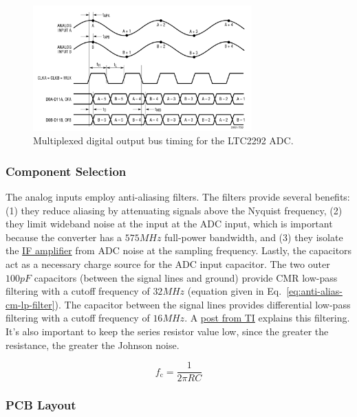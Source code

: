 \begin{figure}[h]
        \centering\includegraphics[width=0.75\textwidth]{data/LTC2292-multiplex.png}
        \caption{Multiplexed digital output bus timing for the LTC2292 ADC.}
        \label{fig:ltc2292-multiplex}
\end{figure}

\subsubsection{Component Selection}
\label{sec:ltc2292-component-selection}

The analog inputs employ anti-aliasing filters. The filters provide several benefits: (1) they
reduce aliasing by attenuating signals above the Nyquist frequency, (2) they limit wideband noise at
the input at the ADC input, which is important because the converter has a $575 \si{MHz}$ full-power
bandwidth, and (3) they isolate the \hyperref[sec:ada4940-2]{IF amplifier} from ADC noise at the
sampling frequency. Lastly, the capacitors act as a necessary charge source for the ADC input
capacitor. The two outer $100 \si{pF}$ capacitors (between the signal lines and ground) provide CMR
low-pass filtering with a cutoff frequency of $32 \si{MHz}$ (equation given in
Eq.~\ref{eq:anti-alias-cm-lp-filter}). The capacitor between the signal lines provides differential
low-pass filtering with a cutoff frequency of $16 \si{MHz}$. A
\href{https://e2e.ti.com/blogs_/archives/b/precisionhub/archive/2015/11/06/three-guidelines-for-designing-anti-aliasing-filters}{post
  from TI} explains this filtering. It's also important to keep the series resistor value low, since
the greater the resistance, the greater the Johnson noise.

\begin{equation}
        \label{eq:anti-alias-cm-lp-filter}
        f_{\text{c}} = \frac{1}{2 \pi R C}
\end{equation}

\subsubsection{PCB Layout}
\label{sec:ltc2292-pcb}



